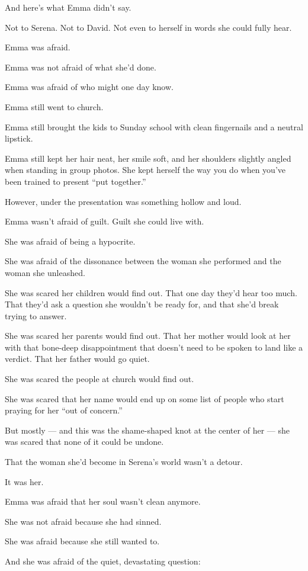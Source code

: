 And here’s what Emma didn’t say.

Not to Serena.
Not to David.
Not even to herself in words she could fully hear.

Emma was afraid. 

Emma was not afraid of what she’d done.

Emma was afraid of who might one day know.

Emma still went to church.

Emma still brought the kids to Sunday school with clean fingernails and a neutral lipstick.

Emma still kept her hair neat, her smile soft, and her shoulders slightly angled when standing in group 
photos. She kept herself the way you do when you’ve been trained to present ``put together.''

However, under the presentation was something hollow and loud.

Emma wasn’t afraid of guilt. Guilt she could live with.

She was afraid of being a hypocrite.

She was afraid of the dissonance between the woman she performed and the woman she unleashed.

She was scared her children would find out.
That one day they’d hear too much. That they'd ask a question she wouldn't be ready 
for, and that she'd break trying to answer.

She was scared her parents would find out.
That her mother would look at her with that bone-deep disappointment that doesn’t need to be spoken to 
land like a verdict.
That her father would go quiet.

She was scared the people at church would find out.

She was scared that her name would end up on some list of people who start praying for her ``out of concern.''

But mostly --- and this was the shame-shaped knot at the center of her ---
she was scared that none of it could be undone.

That the woman she’d become in Serena’s world wasn’t a detour.

It was her.

Emma was afraid that her soul wasn’t clean anymore. 

She was not afraid because she had sinned. 

She was afraid because she still wanted to.

And she was afraid of the quiet, devastating question:

